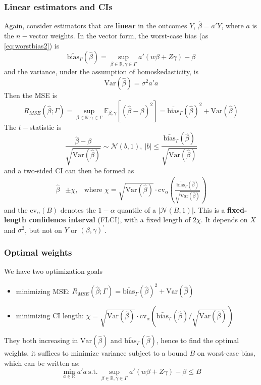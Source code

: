 \documentclass{article}
\begin{document}
\subsubsection*{Linear estimators and CIs}
Again, consider estimators that are \textbf{linear} in the outcomes $Y$, $\hat{\beta}=a'Y$, where $a$ is the $n-$vector weights. In the vector form, the worst-case bias (as \ref{eq:worstbias2}) is 
\begin{equation}
  \bar{\mathrm{bias}}_{\Gamma}\left(\hat{\beta}\right) = \sup_{\beta\in\mathbb{R},\gamma\in\Gamma} a'\left( w\beta + Z\gamma \right)-\beta
\end{equation}
and the variance, under the assumption of homoskedasticity, is $$ \mathrm{Var} \left(\hat{\beta}\right) = \sigma^2a'a $$
Then the MSE is 
$$
  R_{MSE}\left(\hat{\beta};\Gamma\right)=\sup_{\beta\in\mathbb{R},\gamma\in\Gamma}\mathbb{E}_{\beta,\gamma}\left[\left(\hat{\beta}-\beta\right)^2\right]=\bar{\mathrm{bias}}_{\Gamma}\left(\hat{\beta}\right)^2 +\mathrm{Var}\left(\hat{\beta}\right)
$$
The $t-$statistic is $$ \frac{\hat{\beta}-\beta}{\sqrt{\mathrm{Var}\left(\hat{\beta}\right)}} \sim \mathcal{N}(b,1),\ \lvert b\rvert\leq \frac{\bar{\mathrm{bias}}_{\Gamma}\left(\hat{\beta}\right)}{\sqrt{\mathrm{Var}\left(\hat{\beta}\right)}}$$
and a two-sided CI can then be formed as
\begin{align}
  \hat{\beta} &\pm \chi, &\text{where }\chi=\sqrt{\mathrm{Var}\left(\hat{\beta}\right)}\cdot \mathrm{cv}_{\alpha}\left( \frac{\bar{\mathrm{bias}}_{\Gamma}\left(\hat{\beta}\right)}{\sqrt{\mathrm{Var}\left(\hat{\beta}\right)}} \right)
\end{align}
and the $\mathrm{cv}_{\alpha}(B)$ denotes the $1-\alpha$ quantile of a $\lvert \mathcal{N}(B,1) \rvert$. This is a \textbf{fixed-length confidence interval} (FLCI), with a fixed length of $2\chi$. It depends on $X$ and $\sigma^2$, but not on $Y$ or $(\beta,\gamma)^{\prime}$.

\subsubsection*{Optimal weights}
We have two optimization goals
\begin{itemize}
  \item minimizing MSE: $ R_{MSE}\left(\hat{\beta};\Gamma\right)=\bar{\mathrm{bias}}_{\Gamma}\left(\hat{\beta}\right)^2 +\mathrm{Var}\left(\hat{\beta}\right)$
  \item minimizing CI length: $\chi=\sqrt{\mathrm{Var}\left(\hat{\beta}\right)}\cdot \mathrm{cv}_{\alpha}\left( \bar{\mathrm{bias}}_{\Gamma}\left(\hat{\beta}\right)/\sqrt{\mathrm{Var}\left(\hat{\beta}\right)} \right)$
\end{itemize}
They both increasing in $\mathrm{Var}\left(\hat{\beta}\right)$ and $\bar{\mathrm{bias}}_{\Gamma}\left(\hat{\beta}\right)$, hence to find the optimal weights, it suffices to minimize variance subject to a bound $B$ on worst-case bias, which can be written as:
\begin{equation}\label{eq:solve_optimalweight}
  \min_{a\in\mathbb{R}}a'a\ \text{s.t.}\ \sup_{\beta\in\mathbb{R},\gamma\in\Gamma}a'\left(w\beta+Z\gamma \right)-\beta \leq B
\end{equation}
\end{document}
